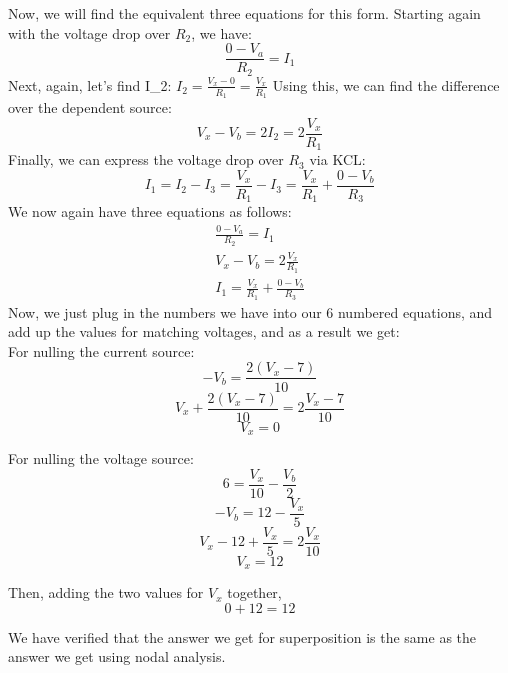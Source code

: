 \begin{enumerate}
{\begin{center}
\begin{circuitikz}
        \end{circuitikz}
        \end{center}

    Now, we will find the equivalent three equations for this form. Starting again with the voltage drop over $R_2$, we have:
    $$ \frac{0 - V_a}{R_2} = I_1 $$
    Next, again, let's find I_2:
    $I_2 = \frac{V_x - 0}{R_1} = \frac{V_x}{R_1}$
    Using this, we can find the difference over the dependent source:
    \[ V_x - V_b = 2I_2 = 2\frac{V_x}{R_1} \]
    Finally, we can express the voltage drop over $R_3$ via KCL:
    \[ I_1 = I_2 - I_3 = \frac{V_x}{R_1} - I_3 = \frac{V_x}{R_1} + \frac{0 - V_b}{R_3}\]
    We now again have three equations as follows:
    \begin{align}
        \frac{0 - V_a}{R_2} = I_1 \\
        V_x - V_b = 2\frac{V_x}{R_1}\\
        I_1 = \frac{V_x}{R_1} + \frac{0 - V_b}{R_3}
    \end{align}
    Now, we just plug in the numbers we have into our 6 numbered equations, and add up the values for matching voltages, and as a result we get:\\
    
    For nulling the current source:
    $$-V_b = \frac{2(V_x - 7)}{10}$$
    $$V_x + \frac{2(V_x - 7)}{10} = 2\frac{V_x - 7}{10}$$
    $$V_x = 0$$
    
    For nulling the voltage source:
    $$6 = \frac{V_x}{10} - \frac{V_b}{2}$$
    $$-V_b = 12 - \frac{V_x}{5}$$
    $$V_x - 12 + \frac{V_x}{5} = 2\frac{V_x}{10}$$
    $$V_x = 12$$
    
    Then, adding the two values for $V_x$ together,
    $$0 + 12 = 12$$
    
    We have verified that the answer we get for superposition is the same as the answer we get using nodal analysis.
    
    }
    
    \end{enumerate}